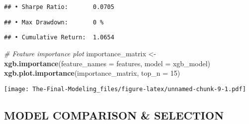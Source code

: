 \documentclass[
]{article}
\newenvironment{Shaded}{\begin{snugshade}}{\end{snugshade}}
\newcommand{\AttributeTok}[1]{\textcolor[rgb]{0.13,0.29,0.53}{#1}}
\newcommand{\CommentTok}[1]{\textcolor[rgb]{0.56,0.35,0.01}{\textit{#1}}}
\newcommand{\DecValTok}[1]{\textcolor[rgb]{0.00,0.00,0.81}{#1}}
\newcommand{\FunctionTok}[1]{\textcolor[rgb]{0.13,0.29,0.53}{\textbf{#1}}}
\newcommand{\NormalTok}[1]{#1}
\newcommand{\OtherTok}[1]{\textcolor[rgb]{0.56,0.35,0.01}{#1}}
\newcommand{\SpecialCharTok}[1]{\textcolor[rgb]{0.81,0.36,0.00}{\textbf{#1}}}
\newcommand{\StringTok}[1]{\textcolor[rgb]{0.31,0.60,0.02}{#1}}
\begin{document}
\begin{verbatim}
## • Sharpe Ratio:       0.0705
\end{verbatim}

\begin{Shaded}
\end{Shaded}

\begin{verbatim}
## • Max Drawdown:       0 %
\end{verbatim}

\begin{Shaded}
\end{Shaded}

\begin{verbatim}
## • Cumulative Return:  1.0654
\end{verbatim}

\begin{Shaded}
\begin{Highlighting}[]
\CommentTok{\#  Feature importance plot}
\NormalTok{importance\_matrix }\OtherTok{\textless{}{-}} \FunctionTok{xgb.importance}\NormalTok{(}\AttributeTok{feature\_names =}\NormalTok{ features, }\AttributeTok{model =}\NormalTok{ xgb\_model)}
\FunctionTok{xgb.plot.importance}\NormalTok{(importance\_matrix, }\AttributeTok{top\_n =} \DecValTok{15}\NormalTok{)}
\end{Highlighting}
\end{Shaded}

\texttt{[image: The-Final-Modeling\_files/figure-latex/unnamed-chunk-9-1.pdf]}

\subsection{MODEL COMPARISON \&
SELECTION}\label{model-comparison-selection}
\end{document}
